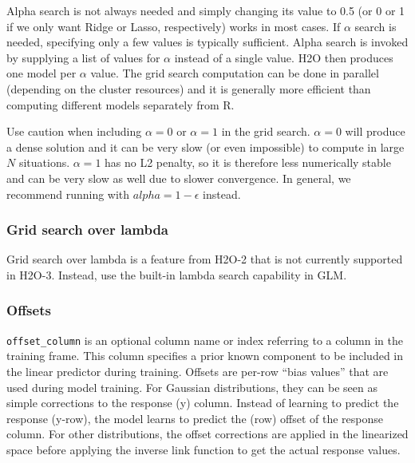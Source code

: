 Alpha search is not always needed and simply changing its value to 0.5 (or 0 or 1 if we only want Ridge or Lasso,
respectively) works in most cases. If $\alpha$ search is needed, specifying only a few values is typically sufficient. Alpha
search is invoked by supplying a list of values for $\alpha$ instead of a single value. H2O then produces one model
per $\alpha$ value. The grid search computation can be done in parallel (depending on the cluster resources) and it
is generally more efficient than computing different models separately from R.

Use caution when including $\alpha=0$ or $\alpha=1$ in the grid search. $\alpha=0$ will produce a dense solution
and it can be very slow (or even impossible) to compute in large $N$ situations. $\alpha=1$ has no L2 penalty, so
it is therefore less numerically stable and can be very slow as well due to slower convergence. In general, we recommend running with $alpha=1-\epsilon$ instead.

\waterExampleInR


\subsubsection{Grid search over lambda}


% 

Grid search over lambda is a feature from H2O-2 that is not currently supported in H2O-3.  Instead, use the built-in lambda
search capability in GLM.

\subsubsection{Offsets}

\texttt{offset\_column} is an optional column name or index referring to a column in the training frame. This column specifies a prior known component to be included in the linear predictor during training. Offsets are per-row “bias values” that are used during model training. For Gaussian distributions, they can be seen as simple corrections to the response (y) column. Instead of learning to predict the response (y-row), the model learns to predict the (row) offset of the response column. For other distributions, the offset corrections are applied in the linearized space before applying the inverse link function to get the actual response values.  


